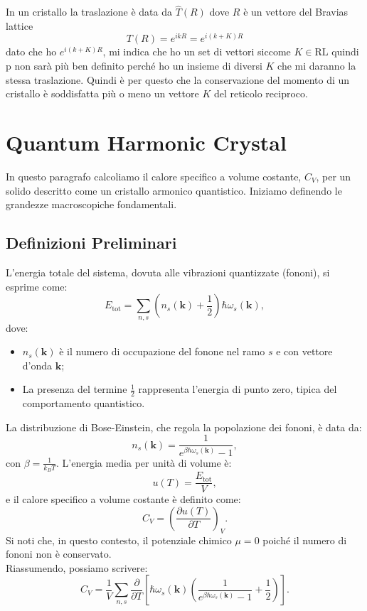 In un cristallo la traslazione è data da $\hat{T}(R)$ dove $R$ è un vettore del Bravias lattice
\[ T(R) = e^{ikR} = e^{i(k+K)R}\]
dato che ho $e^{i(k+K)R}$, mi indica che ho un set di vettori siccome $K \in \text{RL}$ quindi p non sarà più ben definito perché ho un insieme di diversi $K$ che mi daranno la stessa traslazione. Quindi è per questo che la conservazione del momento di un cristallo è soddisfatta più o meno un vettore $K$ del reticolo reciproco.


\section{Quantum Harmonic Crystal}
In questo paragrafo calcoliamo il calore specifico a volume costante, \(C_V\), per un solido descritto come un cristallo armonico quantistico. Iniziamo definendo le grandezze macroscopiche fondamentali.
\subsection*{Definizioni Preliminari}
L'energia totale del sistema, dovuta alle vibrazioni quantizzate (fononi), si esprime come:
\begin{equation}
    E_{\text{tot}} = \sum_{n,s} \left(n_s(\mathbf{k}) + \frac{1}{2}\right) \hbar \omega_s(\mathbf{k}),
\end{equation}
dove:
\begin{itemize}
    \item \(n_s(\mathbf{k})\) è il numero di occupazione del fonone nel ramo \(s\) e con vettore d'onda \(\mathbf{k}\);
    \item La presenza del termine \(\frac{1}{2}\) rappresenta l'energia di punto zero, tipica del comportamento quantistico.
\end{itemize}
La distribuzione di Bose-Einstein, che regola la popolazione dei fononi, è data da:
\begin{equation}
    n_s(\mathbf{k}) = \frac{1}{e^{\beta \hbar \omega_s(\mathbf{k})} - 1},
\end{equation}
con \(\beta = \frac{1}{k_B T}\).
L'energia media per unità di volume è:
\begin{equation}
    u(T) = \frac{E_{\text{tot}}}{V},
\end{equation}
e il calore specifico a volume costante è definito come:
\begin{equation}
    C_V = \left(\frac{\partial u(T)}{\partial T}\right)_V.
\end{equation}
Si noti che, in questo contesto, il potenziale chimico \(\mu = 0\) poiché il numero di fononi non è conservato.\\
Riassumendo, possiamo scrivere:
\begin{equation}
    C_V = \frac{1}{V}\sum_{n,s} \frac{\partial}{\partial T} \left[ \hbar \omega_s(\mathbf{k}) \left( \frac{1}{e^{\beta \hbar \omega_s(\mathbf{k})} - 1} + \frac{1}{2} \right) \right].
\end{equation}
